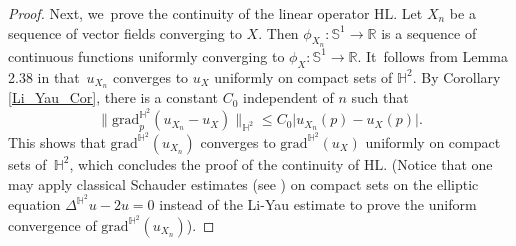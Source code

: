 \documentclass[10pt]{amsart}
\theoremstyle{plain}
\theoremstyle{definition}
\newcommand{\grad}{\mathrm{grad}^{\mathbb{H}^2}}
\begin{document}
\begin{proof}
Next, we~prove the continuity of the linear operator $\mathrm{HL}$. Let $X_n$ be a sequence of vector fields converging to $X$. Then $\phi_{X_n}:\mathbb{S}^1 \to \mathbb{R}$ is a sequence of continuous functions uniformly converging to $\phi_X:\mathbb{S}^1 \to \mathbb{R}$. It~follows from Lemma 2.38 in \cite{barbotfillastre} that~$u_{X_n}$ converges to $u_X$ uniformly on compact sets of $\mathbb{H}^2$. By Corollary \ref{Li_Yau_Cor}, there is a constant $C_0$ independent of $n$ such that
\[
\lVert \grad_p(u_{X_n}-u_X)\rVert_{\mathbb{H}^2}\leq C_0\lvert u_{X_n}(p)-u_X(p)\rvert.
\]
This shows that $\grad(u_{X_n})$ converges to $\grad(u_X)$ uniformly on compact sets of~$\mathbb{H}^2$, which concludes the proof of the continuity of $\mathrm{HL}$. (Notice that one may apply classical Schauder estimates (see \cite{PDE_Book}) on compact sets on the elliptic equation $\Delta^{\mathbb{H}^2} u - 2u=0$ instead of the Li-Yau estimate to prove the uniform convergence of $\grad(u_{X_n})$).


\end{proof}
\end{document}
